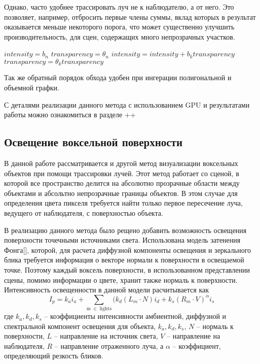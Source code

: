 \documentclass[a4paper,14pt]{extreport}
\begin{document}
Однако, часто удобнее трассировать луч не к наблюдателю, а от него. Это позволяет, например, отбросить первые члены суммы, вклад которых в результат оказывается меньше некоторого порога, что может существенно улучшить производительность, для сцен, содержащих много непрозрачных участков.

\begin{algorithmic}
\STATE $intensity = b_n$
\STATE $transparency = \theta_n$
\STATE $intensity = intensity + b_k transparency$
\STATE $transparency = \theta_k transparency$
\ENDFOR
\end{algorithmic}

Так же обратный порядок обхода удобен при ингерации полигональной и объемной графки.

С деталями реализации данного метода с использованием GPU и результатами работы можно ознакомиться в разделе ++

\subsection{Освещение воксельной поверхности}

В данной работе рассматривается и другой метод визуализации воксельных объектов при помощи трассировки лучей. Этот метод работает со сценой, в которой все пространство делится на абсолютно прозрачные области между объектами и абсольтно непрозрачные границы объектов. В этом случае для определения цвета пикселя требуется найти только первое пересечение луча, ведущего от наблюдателя, с поверхностью объекта. 

В реализацию данного метода было рещено добавить возможность освещения поверхности точечными источниками света. Использована модель затенения Фонга[], которой, для расчета диффузной компоненты освещения и зеркального блика требуется информация о векторе нормали к поверхности в освещаемой точке. Поэтому каждый воксель поверхности, в использованном представлении сцены, помимо информации о цвете, хранит также нормаль к поверхности. Интенсивность освещенности в данной модели расчитывается как $$ I_p = k_a i_a + \sum_\mathrm{m \; \in \; lights} (k_d (L_m \cdot N) i_d + k_s (R_m \cdot V)^{\alpha}i_s $$
где  $k_a, k_d, k_s$ -- коэффициенты интенсивности амбиентной, диффузной и спектральной компонент освещения для объекта, $k_a, k_d, k_s$, $N$ -- нормаль к поверхности, $L$ -- направление на источник света, $V$ -- направление на наблюдателя, $R$ -- направление отраженного луча, а $\alpha$ -- коэффициент, определяющий резкость бликов.
\end{document}
